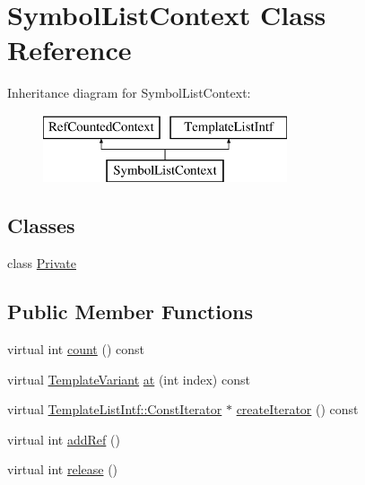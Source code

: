 \hypertarget{class_symbol_list_context}{}\section{Symbol\+List\+Context Class Reference}
\label{class_symbol_list_context}
Inheritance diagram for Symbol\+List\+Context\+:\begin{figure}[H]
\begin{center}
\leavevmode
\includegraphics[height=2.000000cm]{class_symbol_list_context}
\end{center}
\end{figure}
\subsection*{Classes}
\begin{DoxyCompactItemize}
\item 
class \mbox{\hyperlink{class_symbol_list_context_1_1_private}{Private}}
\end{DoxyCompactItemize}
\subsection*{Public Member Functions}
\begin{DoxyCompactItemize}
\item 
virtual int \mbox{\hyperlink{class_symbol_list_context_a7e3a32d2decc135e7fdf6141fee37471}{count}} () const
\item 
virtual \mbox{\hyperlink{class_template_variant}{Template\+Variant}} \mbox{\hyperlink{class_symbol_list_context_ac77916a7663380ea98b505a0892a3abc}{at}} (int index) const
\item 
virtual \mbox{\hyperlink{class_template_list_intf_1_1_const_iterator}{Template\+List\+Intf\+::\+Const\+Iterator}} $\ast$ \mbox{\hyperlink{class_symbol_list_context_a4a06f0941b227a1ed2baa3bf8f1d61ea}{create\+Iterator}} () const
\item 
virtual int \mbox{\hyperlink{class_symbol_list_context_ad1f97238c59a879729d505235cd81c46}{add\+Ref}} ()
\item 
virtual int \mbox{\hyperlink{class_symbol_list_context_ab793c4223391f4cf6c04c0e35af654f6}{release}} ()
\end{DoxyCompactItemize}
